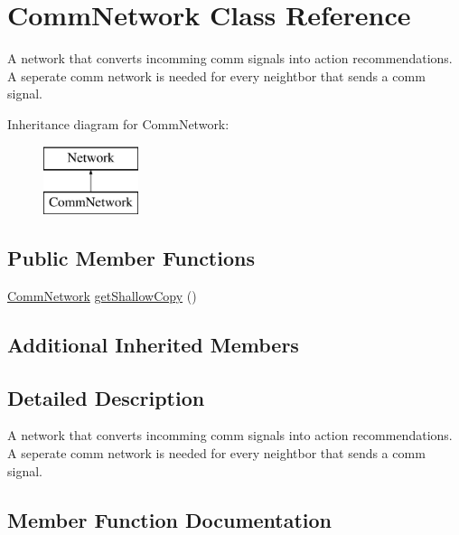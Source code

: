 \hypertarget{class_comm_network}{}\section{Comm\+Network Class Reference}
\label{class_comm_network}


A network that converts incomming comm signals into action recommendations. A seperate comm network is needed for every neightbor that sends a comm signal.  


Inheritance diagram for Comm\+Network\+:\begin{figure}[H]
\begin{center}
\leavevmode
\includegraphics[height=2.000000cm]{class_comm_network}
\end{center}
\end{figure}
\subsection*{Public Member Functions}
\begin{DoxyCompactItemize}
\item 
\mbox{\hyperlink{class_comm_network}{Comm\+Network}} \mbox{\hyperlink{class_comm_network_a22078a6183c8ca5be7b40964d57d1258}{get\+Shallow\+Copy}} ()
\end{DoxyCompactItemize}
\subsection*{Additional Inherited Members}


\subsection{Detailed Description}
A network that converts incomming comm signals into action recommendations. A seperate comm network is needed for every neightbor that sends a comm signal. 



\subsection{Member Function Documentation}
\mbox{\label{class_comm_network_a22078a6183c8ca5be7b40964d57d1258}} 
